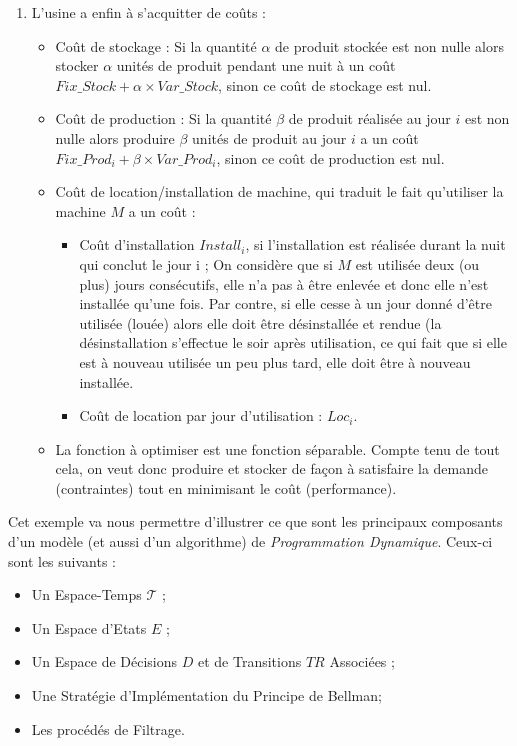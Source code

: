 \begin{enumerate}
\begin{itemize}[label=$\square$]
	\end{itemize}
	\item	L'usine a enfin à s'acquitter de coûts : 
	\begin{itemize}[label=$\square$]
		\item	Coût de stockage : Si la quantité $\alpha$ de produit stockée est non nulle alors stocker $\alpha$ unités de produit pendant une nuit à un coût $Fix\_Stock + \alpha \times Var\_Stock$, sinon ce coût de stockage est nul. 
		\item	Coût de production : Si la quantité $\beta$ de produit réalisée au jour $i$ est non nulle alors produire $\beta$ unités de produit au jour $i$ a un coût $Fix\_Prod_i + \beta \times Var\_Prod_i$, sinon ce coût de production est nul.
		\item	Coût de location/installation de machine, qui traduit le fait qu'utiliser la machine $M$ a un coût : 
		\begin{itemize}
			\item	Coût d'installation $Install_i$, si l'installation est réalisée durant la nuit qui conclut le jour i ; On considère que si $M$ est utilisée deux (ou plus) jours consécutifs, elle n'a pas à être enlevée et donc elle n'est installée qu'une fois. Par contre, si elle cesse à un jour donné d'être utilisée (louée) alors elle doit être désinstallée et rendue (la désinstallation s'effectue le soir après utilisation, ce qui fait que si elle est à nouveau utilisée un peu plus tard, elle doit être à nouveau installée.
			\item Coût de location par jour d'utilisation : $Loc_i$.
			
		\end{itemize}
		\item 	La fonction à optimiser est une fonction séparable. Compte tenu de tout cela, on veut donc produire et stocker de façon à satisfaire la demande (contraintes) tout en minimisant le coût (performance). 
	\end{itemize}
\end{enumerate}
Cet exemple va nous permettre d'illustrer ce que sont les principaux composants d'un modèle (et aussi d'un algorithme) de \textit{Programmation Dynamique}. Ceux-ci sont les suivants : 
\begin{itemize}[label=$\square$]
	\item Un Espace-Temps $\mathcal{T}$ ;
	\item Un Espace d'Etats  $E$ ;
	\item Un Espace de Décisions $D$ et de Transitions $TR$ Associées ;
	\item Une Stratégie d'Implémentation du Principe de Bellman;
	\item Les procédés de Filtrage.
\end{itemize}

